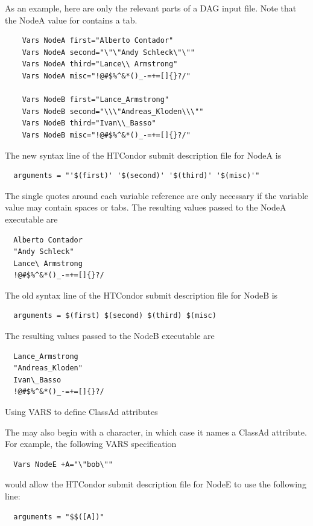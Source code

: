 As an example, here are only the relevant parts of a DAG input file.
Note that the NodeA value for  contains a tab.
\footnotesize
\begin{verbatim}
    Vars NodeA first="Alberto Contador"
    Vars NodeA second="\"\"Andy	Schleck\"\""
    Vars NodeA third="Lance\\ Armstrong"
    Vars NodeA misc="!@#$%^&*()_-=+=[]{}?/"
    
    Vars NodeB first="Lance_Armstrong"
    Vars NodeB second="\\\"Andreas_Kloden\\\""
    Vars NodeB third="Ivan\\_Basso"
    Vars NodeB misc="!@#$%^&*()_-=+=[]{}?/"
\end{verbatim}
\normalsize

The new syntax  line of the HTCondor submit description file
for NodeA is
\footnotesize
\begin{verbatim}
  arguments = "'$(first)' '$(second)' '$(third)' '$(misc)'"
\end{verbatim}
\normalsize
The single quotes around each variable reference are only necessary
if the variable value may contain spaces or tabs.
The resulting values passed to the NodeA executable are
\footnotesize
\begin{verbatim}
  Alberto Contador
  "Andy	Schleck"
  Lance\ Armstrong
  !@#$%^&*()_-=+=[]{}?/
\end{verbatim}
\normalsize

The old syntax  line of the HTCondor submit description file
for NodeB is
\footnotesize
\begin{verbatim}
  arguments = $(first) $(second) $(third) $(misc)
\end{verbatim}
\normalsize

The resulting values passed to the NodeB executable are
\footnotesize
\begin{verbatim}
  Lance_Armstrong
  "Andreas_Kloden"
  Ivan\_Basso
  !@#$%^&*()_-=+=[]{}?/
\end{verbatim}
\normalsize

\begin{description}
\item[Using VARS to define ClassAd attributes]
\end{description}

The  may also begin with a \Expr{+} character, in which case it
names a ClassAd attribute. For example, the following VARS specification
\begin{verbatim}
  Vars NodeE +A="\"bob\""
\end{verbatim}
would allow the HTCondor submit description file for NodeE to use
the following line:
\begin{verbatim}
  arguments = "$$([A])"
\end{verbatim}

